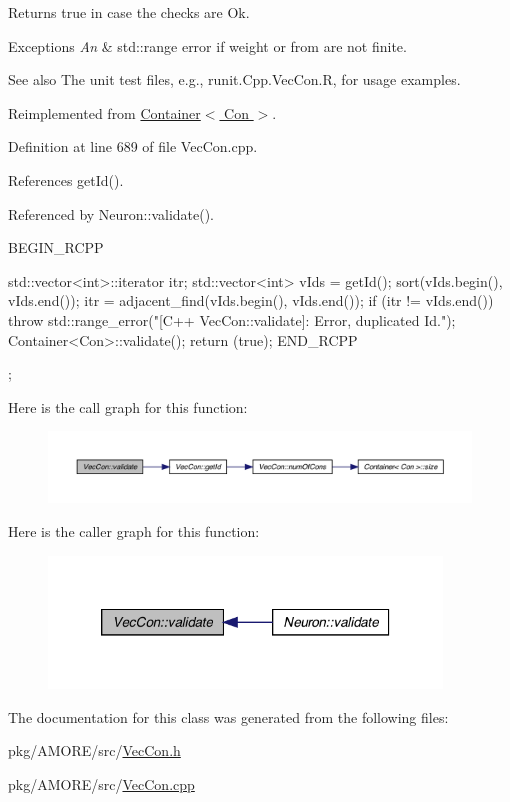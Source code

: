 \begin{DoxyReturn}{Returns}
true in case the checks are Ok.
\end{DoxyReturn}

\begin{DoxyExceptions}{Exceptions}
{\em An} & std::range error if weight or from are not finite.\\
\hline
\end{DoxyExceptions}
\begin{DoxySeeAlso}{See also}
The unit test files, e.g., runit.Cpp.VecCon.R, for usage examples. 
\end{DoxySeeAlso}


Reimplemented from \hyperlink{class_container_aa99a036fd0fe6d6b82ba558157e557d3}{Container$<$ Con $>$}.



Definition at line 689 of file VecCon.cpp.



References getId().



Referenced by Neuron::validate().


\begin{DoxyCode}
{
  BEGIN_RCPP

  std::vector<int>::iterator itr;
  std::vector<int> vIds = getId();
  sort(vIds.begin(), vIds.end());
  itr = adjacent_find(vIds.begin(), vIds.end());
  if (itr != vIds.end())
    throw std::range_error("[C++ VecCon::validate]: Error, duplicated Id.");
  Container<Con>::validate();
  return (true);
END_RCPP};
\end{DoxyCode}


Here is the call graph for this function:\nopagebreak
\begin{figure}[H]
\begin{center}
\leavevmode
\includegraphics[width=400pt]{class_vec_con_af008396d3982fb7ccf1af9618b89937c_cgraph}
\end{center}
\end{figure}




Here is the caller graph for this function:\nopagebreak
\begin{figure}[H]
\begin{center}
\leavevmode
\includegraphics[width=296pt]{class_vec_con_af008396d3982fb7ccf1af9618b89937c_icgraph}
\end{center}
\end{figure}




The documentation for this class was generated from the following files:\begin{DoxyCompactItemize}
\item 
pkg/AMORE/src/\hyperlink{_vec_con_8h}{VecCon.h}\item 
pkg/AMORE/src/\hyperlink{_vec_con_8cpp}{VecCon.cpp}\end{DoxyCompactItemize}
